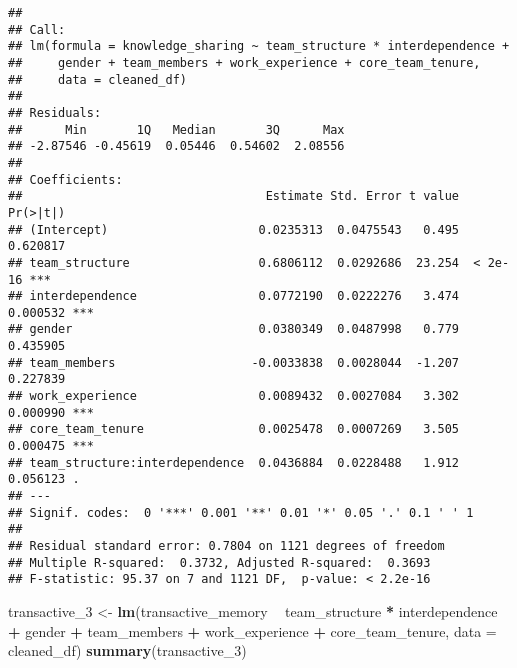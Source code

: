 \documentclass[]{article}
\newenvironment{Shaded}{\begin{snugshade}}{\end{snugshade}}
\newcommand{\DataTypeTok}[1]{\textcolor[rgb]{0.13,0.29,0.53}{#1}}
\newcommand{\DecValTok}[1]{\textcolor[rgb]{0.00,0.00,0.81}{#1}}
\newcommand{\KeywordTok}[1]{\textcolor[rgb]{0.13,0.29,0.53}{\textbf{#1}}}
\newcommand{\NormalTok}[1]{#1}
\newcommand{\OperatorTok}[1]{\textcolor[rgb]{0.81,0.36,0.00}{\textbf{#1}}}
\newcommand{\StringTok}[1]{\textcolor[rgb]{0.31,0.60,0.02}{#1}}
\begin{document}
\begin{verbatim}
## 
## Call:
## lm(formula = knowledge_sharing ~ team_structure * interdependence + 
##     gender + team_members + work_experience + core_team_tenure, 
##     data = cleaned_df)
## 
## Residuals:
##      Min       1Q   Median       3Q      Max 
## -2.87546 -0.45619  0.05446  0.54602  2.08556 
## 
## Coefficients:
##                                  Estimate Std. Error t value Pr(>|t|)    
## (Intercept)                     0.0235313  0.0475543   0.495 0.620817    
## team_structure                  0.6806112  0.0292686  23.254  < 2e-16 ***
## interdependence                 0.0772190  0.0222276   3.474 0.000532 ***
## gender                          0.0380349  0.0487998   0.779 0.435905    
## team_members                   -0.0033838  0.0028044  -1.207 0.227839    
## work_experience                 0.0089432  0.0027084   3.302 0.000990 ***
## core_team_tenure                0.0025478  0.0007269   3.505 0.000475 ***
## team_structure:interdependence  0.0436884  0.0228488   1.912 0.056123 .  
## ---
## Signif. codes:  0 '***' 0.001 '**' 0.01 '*' 0.05 '.' 0.1 ' ' 1
## 
## Residual standard error: 0.7804 on 1121 degrees of freedom
## Multiple R-squared:  0.3732, Adjusted R-squared:  0.3693 
## F-statistic: 95.37 on 7 and 1121 DF,  p-value: < 2.2e-16
\end{verbatim}

\begin{Shaded}
\begin{Highlighting}[]
\NormalTok{transactive_}\DecValTok{3}\NormalTok{ <-}\StringTok{ }\KeywordTok{lm}\NormalTok{(transactive_memory }\OperatorTok{~}\StringTok{ }\NormalTok{team_structure }\OperatorTok{*}\StringTok{ }\NormalTok{interdependence }\OperatorTok{+}\StringTok{ }\NormalTok{gender }\OperatorTok{+}\StringTok{ }\NormalTok{team_members }\OperatorTok{+}\StringTok{ }\NormalTok{work_experience }\OperatorTok{+}\StringTok{ }\NormalTok{core_team_tenure, }\DataTypeTok{data =}\NormalTok{ cleaned_df)}
\KeywordTok{summary}\NormalTok{(transactive_}\DecValTok{3}\NormalTok{)}
\end{Highlighting}
\end{Shaded}
\end{document}
